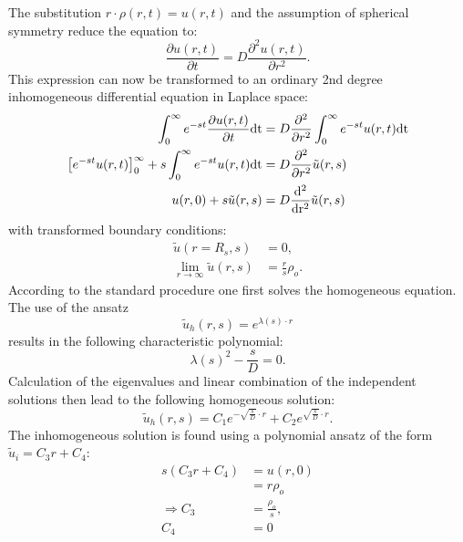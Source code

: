 The substitution $r \cdot \rho(r,t) = u(r,t)$ and the assumption of spherical symmetry reduce the equation to:
\begin{equation}
    \frac{\partial u(r,t)}{\partial t} = D \frac{\partial ^2 u(r,t)}{\partial r^2}.
    \label{Simplified FPE}
\end{equation}
This expression can now be transformed to an ordinary 2nd degree inhomogeneous differential equation in Laplace space:
\begin{align}
    \int_0^\infty e^{-st}\frac{\partial u(r,t)}{\partial t} \rm{d} t &= D \frac{\partial ^2 }{\partial r^2} \int_0^\infty e^{-st} u(r,t) \rm{d} t \\
    \left[e^{-st} u(r,t) \right]_0^\infty + s \int_0^\infty e^{-st} u(r,t) \rm{d} t &= D \frac{\partial^2}{\partial r^2} \tilde{u}(r,s)\\
    u(r,0) + s \tilde{u}(r,s) &= D \frac{\rm{d}^2}{\rm{d} r^2} \tilde{u}(r,s)
\end{align}
with transformed boundary conditions:
\begin{align}
    \tilde{u}(r=R_s,s) &= 0, \nonumber \\
    \lim\limits_{r\rightarrow \infty} \tilde{u}(r,s) &= \frac{r}{s}\rho_o.
    \label{transformed_BC}
\end{align}
According to the standard procedure one first solves the homogeneous equation. The use of the ansatz
\begin{equation}
    \tilde{u}_{h}(r,s) = e^{\lambda(s) \cdot r}
\end{equation}
results in the following characteristic polynomial:
\begin{equation}
    \lambda(s) ^2 - \frac{s}{D} = 0.
    \label{characteristic_polynomial}
\end{equation}
Calculation of the eigenvalues and linear combination of the independent solutions then lead to the following homogeneous solution:
\begin{equation}
    \tilde{u}_h(r,s) = C_1 e^{ - \sqrt{\frac{s}{D}} \cdot r } + C_2 e^{ \sqrt{\frac{s}{D}} \cdot r }.
    \label{u_h}
\end{equation}
The inhomogeneous solution is found using a polynomial ansatz of the form $\tilde{u}_i = C_3 r + C_4$:
\begin{align}
    s(C_3 r + C_4)  &= u(r,0)\nonumber\\
                    &= r \rho_o \nonumber\\
    \Rightarrow C_3 &= \frac{\rho_o}{s}, \nonumber\\
                C_4 &= 0
\end{align}
